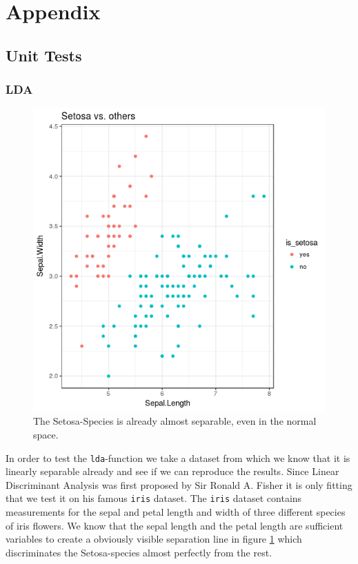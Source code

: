 \documentclass{article}
\begin{document}
\section{Appendix}

\subsection{Unit Tests}
\subsubsection{LDA}

\begin{figure}
\label{iris}
\begin{center}
\includegraphics[scale=0.3, trim={10mm 20mm 30mm 30mm}]{../LDA/iris.png}
\end{center}
\caption{The Setosa-Species is already almost separable, even in the normal space.}
\end{figure}


In order to test the \texttt{lda}-function we take a dataset from which we know that it is linearly separable already and see if we can reproduce the results. Since Linear Discriminant Analysis was first proposed by Sir Ronald A. Fisher it is only fitting that we test it on his famous \texttt{iris} dataset. The \texttt{iris} dataset contains measurements for the sepal and petal length and width of three different species of iris flowers. We know that the sepal length and the petal length are sufficient variables to create a obviously visible separation line in figure \ref{iris} which discriminates the Setosa-species almost perfectly from the rest. 
\end{document}
